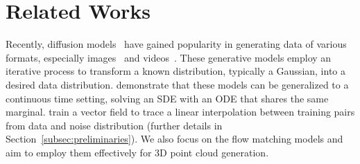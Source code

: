 \vspace{-3mm}
\section{Related Works}
\vspace{-2mm}

Recently, diffusion models~\cite{sohl2015deep,ho2020denoising, song2019generative} have gained popularity in generating data of various formats, especially
images~\cite{rombach2022high,ramesh2022hierarchical} and videos~\cite{blattmann2023stable,videoworldsimulators2024}.
%
These generative models employ an iterative process to transform a known distribution, typically a Gaussian, into a desired data distribution.
%
\citet{song2020score} demonstrate that these models can be generalized to a continuous time setting, solving an SDE with an ODE that shares the same marginal.
%
\citet{lipman2022flow} train a vector field to trace a linear interpolation between training pairs from data and noise distribution (further details in Section~\ref{subsec:preliminaries}). %
%
%
We also focus on the flow matching models and aim to employ them effectively for 3D point cloud generation.

